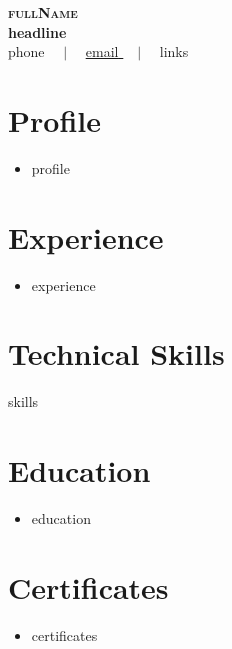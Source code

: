 \documentclass[letterpaper]{article}
\newcommand{\resumeItem}[1]{\item\small{{#1}}}
\newcommand{\resumeSubHeadingListStart}{\begin{itemize}[leftmargin=0.18in, label={}, itemsep=1.2pt, topsep=2.5pt, parsep=0pt]}
\newcommand{\resumeSubHeadingListEnd}{\end{itemize}\vspace{-2pt}}
\begin{document}
\begin{center}
    \textbf{\Huge \scshape \color{navy} {{fullName}}} \\[3pt]
    \small \textbf{\color{accent} {{headline}}} \\[3pt]
    \footnotesize \color{greytext}
    {{phone}} $\quad|\quad$
    \href{mailto:{{email}}}{\underline{ {{email}} }} $\quad|\quad$
    {{links}}
\end{center}
\vspace{4pt}

\section{Profile}
{\obeylines
\resumeSubHeadingListStart
  \resumeItem{ {{profile}} }
\resumeSubHeadingListEnd
}
\vspace{-2pt}

\section{Experience}
{\obeylines
\resumeSubHeadingListStart
  \resumeItem{ {{experience}} }
\resumeSubHeadingListEnd
}

\section{Technical Skills}
{\obeylines
\begin{itemize}[leftmargin=0.18in, label={}, topsep=2pt, itemsep=1pt, parsep=0pt]
\footnotesize{
  \item {{skills}}
}
\end{itemize}
}

\section{Education}
{\obeylines
\resumeSubHeadingListStart
  \resumeItem{ {{education}} }
\resumeSubHeadingListEnd
}

\section{Certificates}
{\obeylines
\resumeSubHeadingListStart
  \resumeItem{ {{certificates}} }
\resumeSubHeadingListEnd
}
\end{document}
